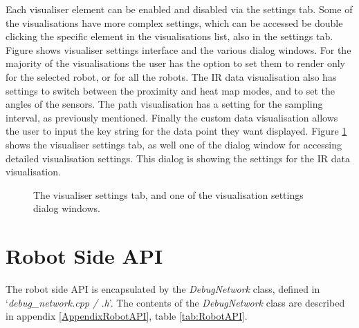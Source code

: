 Each visualiser element can be enabled and disabled via the settings tab. Some of the visualisations have more complex settings, which can be accessed be double clicking the specific element in the visualisations list, also in the settings tab. Figure  shows visualiser settings interface and the various dialog windows. For the majority of the visualisations the user has the option to set them to render only for the selected robot, or for all the robots. The IR data visualisation also has settings to switch between the proximity and heat map modes, and to set the angles of the sensors. The path visualisation has a setting for the sampling interval, as previously mentioned. Finally the custom data visualisation allows the user to input the key string for the data point they want displayed. Figure \ref{fig:VisualiserSettingsTab} shows the visualiser settings tab, as well one of the dialog window for accessing detailed visualisation settings. This dialog is showing the settings for the IR data visualisation.

\begin{figure}
 \centering
 \decoRule
 \caption[Visualiser Settings Tab]{The visualiser settings tab, and one of the visualisation settings dialog windows.}
 \label{fig:VisualiserSettingsTab}
\end{figure}


\section{Robot Side API} \label{RobotSide}
The robot side API is encapsulated by the \textit{DebugNetwork} class, defined in `\textit{debug\_network.cpp / .h}'. The contents of the \textit{DebugNetwork} class are described in appendix \ref{AppendixRobotAPI}, table \ref{tab:RobotAPI}.

